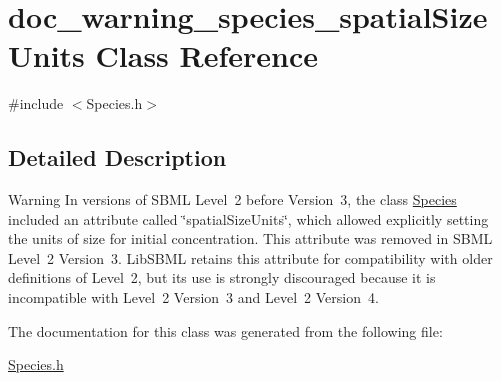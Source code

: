 \hypertarget{classdoc__warning__species__spatial_size_units}{}\section{doc\+\_\+warning\+\_\+species\+\_\+spatial\+Size\+Units Class Reference}
\label{classdoc__warning__species__spatial_size_units}


{\ttfamily \#include $<$Species.\+h$>$}



\subsection{Detailed Description}
\begin{DoxyWarning}{Warning}
In versions of S\+B\+ML Level~2 before Version~3, the class \hyperlink{class_species}{Species} included an attribute called \char`\"{}spatial\+Size\+Units\char`\"{}, which allowed explicitly setting the units of size for initial concentration. This attribute was removed in S\+B\+ML Level~2 Version~3. Lib\+S\+B\+ML retains this attribute for compatibility with older definitions of Level~2, but its use is strongly discouraged because it is incompatible with Level~2 Version~3 and Level~2 Version~4. 
\end{DoxyWarning}


The documentation for this class was generated from the following file\+:\begin{DoxyCompactItemize}
\item 
\hyperlink{_species_8h}{Species.\+h}\end{DoxyCompactItemize}
